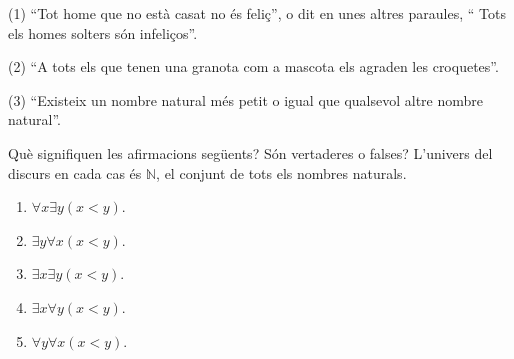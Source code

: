 \begin{solucio}
(1) \textquotedblleft Tot home que no est\`{a} casat no \'{e}s
feli\c{c}\textquotedblright, o dit en unes altres paraules, \textquotedblleft
Tots els homes solters s\'{o}n infeli\c{c}os\textquotedblright.

(2) \textquotedblleft A tots els que tenen una granota com a mascota els
agraden les croquetes\textquotedblright.

(3) \textquotedblleft Existeix un nombre natural m\'{e}s petit o igual que
qualsevol altre nombre natural\textquotedblright.
\end{solucio}

\begin{exercici}
Qu\`{e} signifiquen les afirmacions seg\"{u}ents? S\'{o}n vertaderes o falses?
L'univers del discurs en cada cas \'{e}s $\mathbb{N}$, el conjunt de tots els
nombres naturals.

\begin{enumerate}
\item $\forall x\exists y(x<y)$.

\item $\exists y\forall x(x<y)$.

\item $\exists x\exists y(x<y)$.

\item $\exists x\forall y(x<y)$.

\item $\forall y\forall x(x<y)$.
\end{enumerate}
\end{exercici}

